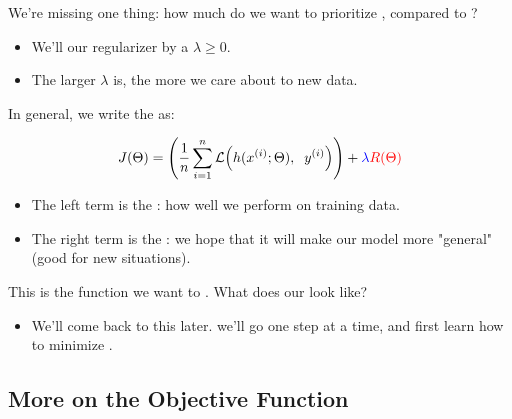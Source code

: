         We're missing one thing: how much do we want to prioritize , compared to ?

        \begin{itemize}
            \item We'll  our regularizer by a  $\lambda \geq 0$.

            \item The larger $\lambda$ is, the more we care about  to new data.\\
        \end{itemize}

        \begin{kequation}
            
            In general, we write the  as:
            
            \begin{equation*}
                J(\Theta) =
                \left( 
                \frac{1}{n}  \sum_{i=1}^n \mathcal{L} \Big( h(x^{(i)}; \Theta), \;\; y^{(i)} \Big) 
                \right)
                +
                \textcolor{blue}{\lambda} \textcolor{red}{ R(\Theta)}
            \end{equation*}

            \begin{itemize}
                \item The left term is the : how well we perform on training data.
                \item The right term is the : we hope that  it will make our model more "general" (good for new situations).
            \end{itemize}
        \end{kequation}

        This is the function we want to . What does our  look like? 

        

        \begin{itemize}
            \item We'll come back to this later. we'll go one step at a time, and first learn how to minimize .
        \end{itemize}

    \subsection{More on the Objective Function}

